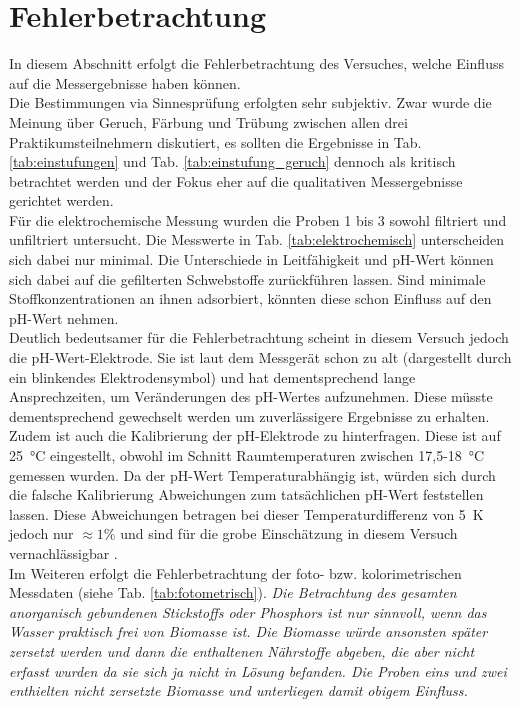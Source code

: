 \chapter{Fehlerbetrachtung}
\label{sec:fehler}
In diesem Abschnitt erfolgt die Fehlerbetrachtung des Versuches, welche Einfluss auf die Messergebnisse haben können.\\
Die Bestimmungen via Sinnesprüfung erfolgten sehr subjektiv. Zwar wurde die Meinung über Geruch, Färbung und Trübung zwischen allen drei Praktikumsteilnehmern diskutiert, es sollten die Ergebnisse in Tab. \ref{tab:einstufungen} und Tab. \ref{tab:einstufung_geruch} dennoch als kritisch betrachtet werden und der Fokus eher auf die qualitativen Messergebnisse gerichtet werden.\\
Für die elektrochemische Messung wurden die Proben 1 bis 3 sowohl filtriert und unfiltriert untersucht. Die Messwerte in Tab. \ref{tab:elektrochemisch} unterscheiden sich dabei nur minimal. Die Unterschiede in Leitfähigkeit und pH-Wert können sich dabei auf die gefilterten Schwebstoffe zurückführen lassen. Sind minimale Stoffkonzentrationen an ihnen adsorbiert, könnten diese schon Einfluss auf den pH-Wert nehmen.\\
Deutlich bedeutsamer für die Fehlerbetrachtung scheint in diesem Versuch jedoch die pH-Wert-Elektrode. Sie ist laut dem Messgerät schon zu alt (dargestellt durch ein blinkendes Elektrodensymbol) und hat dementsprechend lange Ansprechzeiten, um Veränderungen des pH-Wertes aufzunehmen. Diese müsste dementsprechend gewechselt werden um zuverlässigere Ergebnisse zu erhalten. Zudem ist auch die Kalibrierung der pH-Elektrode zu hinterfragen. Diese ist auf \SI{25}{\celsius} eingestellt, obwohl im Schnitt Raumtemperaturen zwischen 17,5-\SI{18}{\celsius} gemessen wurden. Da der pH-Wert Temperaturabhängig ist, würden sich durch die falsche Kalibrierung Abweichungen zum tatsächlichen pH-Wert feststellen lassen. Diese Abweichungen betragen bei dieser Temperaturdifferenz von \SI{5}{\kelvin} jedoch nur $\approx 1\%$ und sind für die grobe Einschätzung in diesem Versuch vernachlässigbar \cite{WasserPH}. \\
Im Weiteren erfolgt die Fehlerbetrachtung der foto- bzw. kolorimetrischen Messdaten (siehe Tab. \ref{tab:fotometrisch}).
\textit{Die Betrachtung des gesamten anorganisch gebundenen Stickstoffs oder Phosphors ist nur sinnvoll, wenn das Wasser praktisch frei von Biomasse ist. Die Biomasse würde ansonsten später zersetzt werden und dann die enthaltenen Nährstoffe abgeben, die aber nicht erfasst wurden da sie sich ja nicht in Lösung befanden. Die Proben eins und zwei enthielten nicht zersetzte Biomasse und unterliegen damit obigem Einfluss.} \\
